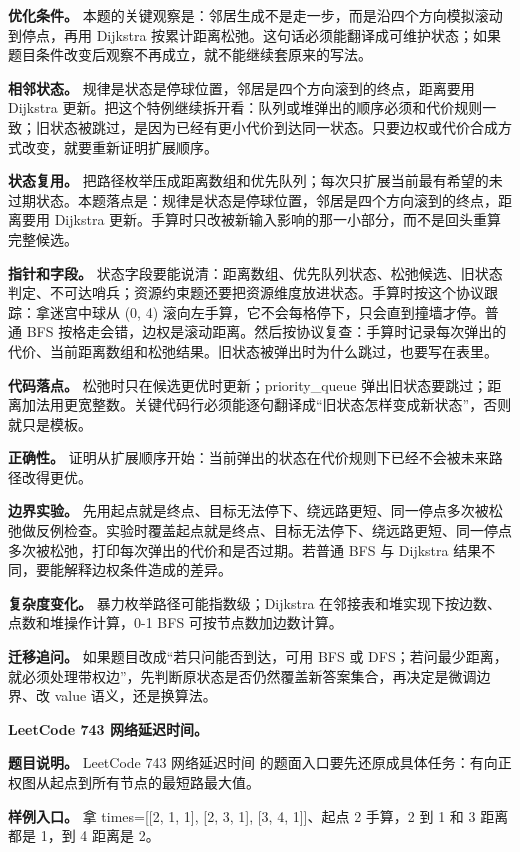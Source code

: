 \textbf{优化条件。} 本题的关键观察是：邻居生成不是走一步，而是沿四个方向模拟滚动到停点，再用 Dijkstra 按累计距离松弛。这句话必须能翻译成可维护状态；如果题目条件改变后观察不再成立，就不能继续套原来的写法。

\textbf{相邻状态。} 规律是状态是停球位置，邻居是四个方向滚到的终点，距离要用 Dijkstra 更新。把这个特例继续拆开看：队列或堆弹出的顺序必须和代价规则一致；旧状态被跳过，是因为已经有更小代价到达同一状态。只要边权或代价合成方式改变，就要重新证明扩展顺序。

\textbf{状态复用。} 把路径枚举压成距离数组和优先队列；每次只扩展当前最有希望的未过期状态。本题落点是：规律是状态是停球位置，邻居是四个方向滚到的终点，距离要用 Dijkstra 更新。手算时只改被新输入影响的那一小部分，而不是回头重算完整候选。

\textbf{指针和字段。} 状态字段要能说清：距离数组、优先队列状态、松弛候选、旧状态判定、不可达哨兵；资源约束题还要把资源维度放进状态。手算时按这个协议跟踪：拿迷宫中球从 (0, 4) 滚向左手算，它不会每格停下，只会直到撞墙才停。普通 BFS 按格走会错，边权是滚动距离。然后按协议复查：手算时记录每次弹出的代价、当前距离数组和松弛结果。旧状态被弹出时为什么跳过，也要写在表里。

\textbf{代码落点。} 松弛时只在候选更优时更新；priority\_queue 弹出旧状态要跳过；距离加法用更宽整数。关键代码行必须能逐句翻译成“旧状态怎样变成新状态”，否则就只是模板。

\textbf{正确性。} 证明从扩展顺序开始：当前弹出的状态在代价规则下已经不会被未来路径改得更优。

\textbf{边界实验。} 先用起点就是终点、目标无法停下、绕远路更短、同一停点多次被松弛做反例检查。实验时覆盖起点就是终点、目标无法停下、绕远路更短、同一停点多次被松弛，打印每次弹出的代价和是否过期。若普通 BFS 与 Dijkstra 结果不同，要能解释边权条件造成的差异。

\textbf{复杂度变化。} 暴力枚举路径可能指数级；Dijkstra 在邻接表和堆实现下按边数、点数和堆操作计算，0-1 BFS 可按节点数加边数计算。

\textbf{迁移追问。} 如果题目改成“若只问能否到达，可用 BFS 或 DFS；若问最少距离，就必须处理带权边”，先判断原状态是否仍然覆盖新答案集合，再决定是微调边界、改 value 语义，还是换算法。

\noindent\textbf{LeetCode 743 网络延迟时间。}

\textbf{题目说明。} LeetCode 743 网络延迟时间 的题面入口要先还原成具体任务：有向正权图从起点到所有节点的最短路最大值。

\textbf{样例入口。} 拿 times=[[2, 1, 1], [2, 3, 1], [3, 4, 1]]、起点 2 手算，2 到 1 和 3 距离都是 1，到 4 距离是 2。

